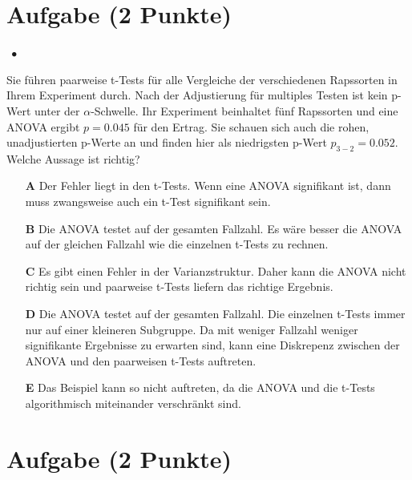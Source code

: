 \documentclass[a4paper, 9pt]{scrartcl}\usepackage[]{graphicx}\usepackage[]{xcolor}
\begin{document}
\section{Aufgabe \hfill (2 Punkte)}

\ifcollection
\begin{flushright}
\tiny\vspace{-2Ex}
\textbf{\examinhaltstart}
\exammodulestatversuch $\;\bullet$
\exammodulebiostat
\vspace{-1Ex}
\end{flushright}
\fi




Sie führen paarweise t-Tests für alle Vergleiche der verschiedenen Rapssorten in Ihrem Experiment durch. Nach der Adjustierung für multiples Testen ist kein p-Wert unter der $\alpha$-Schwelle. Ihr Experiment beinhaltet fünf Rapssorten und eine ANOVA ergibt $p = 0.045$ für den Ertrag. Sie schauen sich auch die rohen, unadjustierten p-Werte an und finden hier als niedrigsten p-Wert $p_{3-2} = 0.052$. Welche Aussage ist richtig?




\begin{enumerate}
\item [\textbf{A} \msquare] Der Fehler liegt in den t-Tests. Wenn eine ANOVA signifikant ist, dann muss zwangsweise auch ein t-Test signifikant sein.
\item [\textbf{B} \msquare] Die ANOVA testet auf der gesamten Fallzahl. Es wäre besser die ANOVA auf der gleichen Fallzahl wie die einzelnen t-Tests zu rechnen.
\item [\textbf{C} \msquare] Es gibt einen Fehler in der Varianzstruktur. Daher kann die ANOVA nicht richtig sein und paarweise t-Tests liefern das richtige Ergebnis.
\item [\textbf{D} \msquare] Die ANOVA testet auf der gesamten Fallzahl. Die einzelnen t-Tests immer nur auf einer kleineren Subgruppe. Da mit weniger Fallzahl weniger signifikante Ergebnisse zu erwarten sind, kann eine Diskrepenz zwischen der ANOVA und den paarweisen t-Tests auftreten.
\item [\textbf{E} \msquare] Das Beispiel kann so nicht auftreten, da die ANOVA und die t-Tests algorithmisch miteinander verschränkt sind.
\end{enumerate}

\section{Aufgabe \hfill (2 Punkte)}
\end{document}
